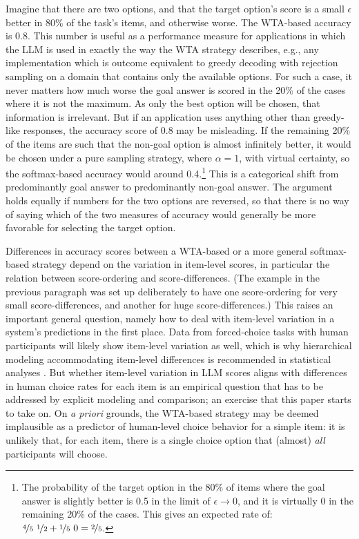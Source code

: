 \documentclass[fleqn]{article}
\begin{document}
Imagine that there are two options, and that the target option's score is a small $\epsilon$ better in 80\% of the task's items, and otherwise worse.
The WTA-based accuracy is 0.8.
This number is useful as a performance measure for applications in which the LLM is used in exactly the way the WTA strategy describes, e.g., any implementation which is outcome equivalent to greedy decoding with rejection sampling on a domain that contains only the available options.
For such a case, it never matters how much worse the goal answer is scored in the 20\% of the cases where it is not the maximum.
As only the best option will be chosen, that information is irrelevant.
But if an application uses anything other than greedy-like responses, the accuracy score of 0.8 may be misleading.
If the remaining 20\% of the items are such that the non-goal option is almost infinitely better, it would be chosen under a pure sampling strategy, where $\alpha = 1$, with virtual certainty, so the softmax-based accuracy would around 0.4.\footnote{The probability of the target option in the 80\% of items where the goal answer is slightly better is 0.5 in the limit of $\epsilon \rightarrow 0$, and it is virtually 0 in the remaining 20\% of the cases. This gives an expected rate of: $\nicefrac{4}{5} \ \nicefrac{1}{2} + \nicefrac{1}{5} \ 0 = \nicefrac{2}{5}$.}
This is a categorical shift from predominantly goal answer to predominantly non-goal answer.
The argument holds equally if numbers for the two options are reversed, so that there is no way of saying which of the two measures of accuracy would generally be more favorable for selecting the target option.

Differences in accuracy scores between a WTA-based or a more general softmax-based strategy depend on the variation in item-level scores, in particular the relation between score-ordering and score-differences.
(The example in the previous paragraph was set up deliberately to have one score-ordering for very small score-differences, and another for huge score-differences.)
This raises an important general question, namely how to deal with item-level variation in a system's predictions in the first place.
Data from forced-choice tasks with human participants will likely show item-level variation as well, which is why hierarchical modeling accommodating item-level differences is recommended in statistical analyses \citep[e.g.,][]{Jaeger2008:Categorical-dat,barr2013}.
But whether item-level variation in LLM scores aligns with differences in human choice rates for each item is an empirical question that has to be addressed by explicit modeling and comparison; an exercise that this paper starts to take on.
On \emph{a priori} grounds, the WTA-based strategy may be deemed implausible as a predictor of human-level choice behavior for a simple item: it is unlikely that, for each item, there is a single choice option that (almost) \emph{all} participants will choose.
\end{document}
